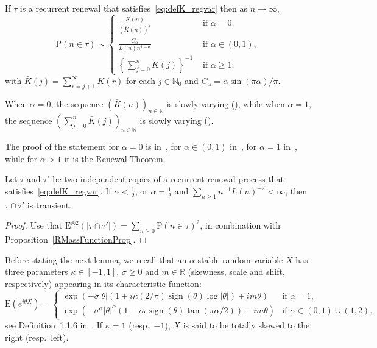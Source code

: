 \documentclass[AHL,Unicode,longabstracts]{cedram}
\DeclareMathOperator{\sign}{sign}
\newcommand{\bbN}{{\ensuremath{\mathbb N}}}
\newcommand{\bbR}{{\ensuremath{\mathbb R}}}
\newcommand{\ga}{\alpha}
\newcommand\bP{\ensuremath{\mathrm{P}}}
\newcommand\bE{\ensuremath{\mathrm{E}}}
\newcommand*{\MK}{\mkern 2mu}
\begin{document}
\begin{prop}\label{RMassFunctionProp}
If $\tau$ is a recurrent renewal that satisfies~\eqref{eq:defK_regvar} then as $n \to \infty$,
\begin{equation}\label{RMassFunction}
\bP(n \in \tau) \sim
\begin{cases}
\frac{K(n)}{(\bar K(n))^2} & \text{ if } \ga = 0,\\[4pt]
\frac{C_\ga}{L(n) n^{1 - \ga}} & \text{ if } \ga \in (0,1),\\[4pt]
\left\{ \sum_{j=0}^n \bar K(j) \right\}^{-1} & \text{ if } \ga \geq 1,
\end{cases}
\end{equation}
with $\bar K(j) = \sum_{r=j+1}^\infty K(r)$ for each $j\in\bbN_0$ and $C_\ga = \ga \sin(\pi \ga)/\pi$.
\end{prop}

When $\ga = 0$, the sequence $(\bar K(n))_{n\in\bbN}$ is slowly varying (\cite[Propos-\linebreak ition~1.5.9$\MK$(b)]{BGT89}), while when $\ga = 1$, the sequence $(\sum_{j=0}^ n \bar K(j))_{n\in\bbN}$ is slowly varying (\cite[Prop\-os\-itions~1.5.10 and~1.5.9$\MK$(a)]{BGT89}).

The proof of the statement for $\ga = 0$ is in~\cite[Theorem~1.1]{Na2012}, for $\ga \in (0,1)$ in~\cite[Theorem~1.1]{GL63}, for $\ga = 1$ in~\cite[Theorem~8.7.5]{BGT89}, while for $\ga > 1$ it is the Renewal Theorem.

\begin{prop}\label{pr:transient.inter}
Let $\tau$ and $\tau'$ be two independent copies of a recurrent renewal process that satisfies~\eqref{eq:defK_regvar}. If $\ga < \frac{1}{2}$, or $\ga = \frac{1}{2}$ and $\sum_{n\geq1} n^{-1} L(n)^{-2} < \infty$, then $\tau \cap \tau'$ is transient.
\end{prop}

\begin{proof}
Use that $\bE^{\otimes 2}(|\tau \cap \tau'|) = \sum_{n\geq0} \bP(n \in \tau)^2$, in combination with Prop\-os\-ition~\ref{RMassFunctionProp}.
\end{proof}

Before stating the next lemma, we recall that an $\ga$-stable random variable $X$ has three parameters $\kappa\in[-1,1]$, $\sigma\ge 0$ and $m\in \bbR$ (skewness, scale and shift, respectively) appearing in its characteristic function:
\begin{equation} \label{eq:stable.cf}
\bE(e^{i\theta X}) =
\begin{cases}
\exp(-\sigma |\theta| (1 + i\kappa (2/\pi) \sign(\theta) \log|\theta|) + im\theta) & \text{if }\ga = 1,\\[4pt]
\exp(-\sigma^\ga |\theta|^\ga (1 - i\kappa \sign(\theta) \tan(\pi \ga /2)) + im\theta) & \text{if } \ga\in(0, 1)\cup(1,2),
\end{cases}
\end{equation} see Definition~1.1.6 in~\cite{ST94}. If $\kappa =1$ (resp.\ $-1$), $X$ is said to be totally skewed to the right (resp.\ left).
\end{document}
